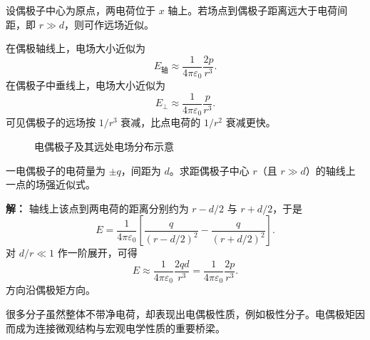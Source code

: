 设偶极子中心为原点，两电荷位于 $x$ 轴上。若场点到偶极子距离远大于电荷间距，即 $r\gg d$，则可作远场近似。

在偶极轴线上，电场大小近似为
\begin{equation}
E_{\text{轴}} \approx \frac{1}{4\pi\varepsilon_0}\frac{2p}{r^3}.
\end{equation}
在偶极子中垂线上，电场大小近似为
\begin{equation}
E_{\perp} \approx \frac{1}{4\pi\varepsilon_0}\frac{p}{r^3}.
\end{equation}
可见偶极子的远场按 $1/r^3$ 衰减，比点电荷的 $1/r^2$ 衰减更快。

\begin{figure}[H]
\centering
{}
\caption{电偶极子及其远处电场分布示意}
\end{figure}

\begin{example}[电偶极子轴线上远处场强估算]
一电偶极子的电荷量为 $\pm q$，间距为 $d$。求距偶极子中心 $r$（且 $r\gg d$）的轴线上一点的场强近似式。

\textbf{解：} 轴线上该点到两电荷的距离分别约为 $r-d/2$ 与 $r+d/2$，于是
\begin{equation}
E = \frac{1}{4\pi\varepsilon_0}\left[\frac{q}{(r-d/2)^2}-\frac{q}{(r+d/2)^2}\right].
\end{equation}
对 $d/r\ll 1$ 作一阶展开，可得
\begin{equation}
E \approx \frac{1}{4\pi\varepsilon_0}\frac{2qd}{r^3}
= \frac{1}{4\pi\varepsilon_0}\frac{2p}{r^3}.
\end{equation}
方向沿偶极矩方向。
\end{example}

\begin{remark}
很多分子虽然整体不带净电荷，却表现出电偶极性质，例如极性分子。电偶极矩因而成为连接微观结构与宏观电学性质的重要桥梁。
\end{remark}

